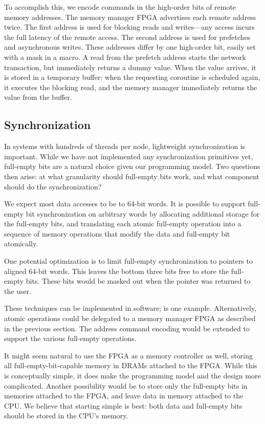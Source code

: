 \documentclass{acm_proc_article-sp}
\begin{document}
To accomplish this, we encode commands in the high-order bits of
remote memory addresses. The memory manager FPGA advertises each
remote address twice. The first address is used for blocking reads and
writes---any access incurs the full latency of the remote
access.  The second address is used for
prefetches and asynchronous writes. These addresses differ by one
high-order bit, easily set with a mask in a macro. A read from the
prefetch address starts the network transaction, but immediately
returns a dummy value. When the value arrives, it is stored in a
temporary buffer; when the requesting coroutine is scheduled again, it
executes the blocking read, and the memory manager immediately returns
the value from the buffer. 

\subsection{Synchronization}

In systems with hundreds of threads per node, lightweight
synchronization is important. While we have not implemented any
synchronization primitives yet, full-empty bits are a natural choice
given our programming model. Two questions then arise: at what
granularity should full-empty bits work, and what component should do
the synchronization?

We expect most data accesses to be to 64-bit words. It is possible to
support full-empty bit synchronization on arbitrary words by
allocating additional storage for the full-empty bits, and translating
each atomic full-empty operation into a sequence of memory operations
that modify the data and full-empty bit atomically. 

One potential optimization is to limit full-empty synchronization to
pointers to aligned 64-bit words. This leaves the bottom three bits
free to store the full-empty bits. These bits would be masked out when
the pointer was returned to the user.

These techniques can be implemented in software; \cite{qthreads} is
one example. Alternatively, atomic operations could be delegated to a
memory manager FPGA as described in the previous section. The address
command encoding would be extended to support the various full-empty
operations.

It might seem natural to use the FPGA as a memory controller as
well, storing all full-empty-bit-capable memory in DRAMs attached to
the FPGA. While this is conceptually simple, it does make the
programming model and the design more complicated. Another possibility
would be to store only the full-empty bits in memories attached to the
FPGA, and leave data in memory attached to the CPU. We believe that
starting simple is best: both data and full-empty bits should be
stored in the CPU's memory. 
\end{document}
